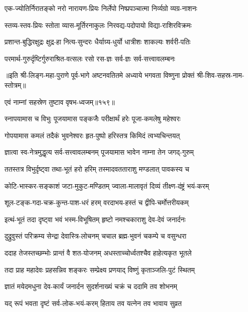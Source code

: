 \twolineshloka
{एक-ज्योतिर्निरातङ्को नरो नारायण-प्रियः}
{निर्लेपो निष्प्रपञ्चात्मा निर्व्यग्रो व्यग्र-नाशनः}

\twolineshloka
{स्तव्य-स्तव-प्रियः स्तोता व्यास-मूर्तिरनाकुलः}
{निरवद्य-पदोपायो विद्या-राशिरविक्रमः}

\twolineshloka
{प्रशान्त-बुद्धिरक्षुद्रः क्षुद्र-हा नित्य-सुन्दरः}
{धैर्याग्र्य-धुर्यो धात्रीशः शाकल्यः शर्वरी-पतिः}

\twolineshloka
{परमार्थ-गुरुर्दृष्टिर्गुरुराश्रित-वत्सलः}
{रसो रस-ज्ञः सर्व-ज्ञः सर्व-सत्त्वावलम्बनः}


॥इति श्री-लिङ्ग-महा-पुराणे पूर्व-भागे अष्टनवतितमे अध्याये भगवता विष्णुना प्रोक्तं श्री-शिव-सहस्र-नाम-स्तोत्रम्॥


{एवं नाम्नां सहस्रेण तुष्टाव वृषभ-ध्वजम्॥१५९॥}%

\resetShloka
\addtocounter{shlokacount}{159}


\twolineshloka
{स्नापयामास च विभुः पूजयामास पङ्कजैः}
{परीक्षार्थं हरेः पूजा-कमलेषु महेश्वरः}%

\twolineshloka
{गोपयामास कमलं तदैकं भुवनेश्वरः}
{हृत-पुष्पो हरिस्तत्र किमिदं त्वभ्यचिन्तयत्}%

\twolineshloka
{ज्ञात्वा स्व-नेत्रमुद्धृत्य सर्व-सत्त्वावलम्बनम्}
{पूजयामास भावेन नाम्ना तेन जगद्-गुरुम्}%

\twolineshloka
{ततस्तत्र विभुर्दृष्ट्वा तथा-भूतं हरो हरिम्}
{तस्मादवतताराशु मण्डलात् पावकस्य च}%

\twolineshloka
{कोटि-भास्कर-सङ्काशं जटा-मुकुट-मण्डितम्}
{ज्वाला-मालावृतं दिव्यं तीक्ष्ण-दंष्ट्रं भयं-करम्}%

\twolineshloka
{शूल-टङ्क-गदा-चक्र-कुन्त-पाश-धरं हरम्}
{वरदाभय-हस्तं च द्वीपि-चर्मोत्तरीयकम्}%

\twolineshloka
{इत्थं-भूतं तदा दृष्ट्वा भवं भस्म-विभूषितम्}
{हृष्टो नमश्चकाराशु देव-देवं जनार्दनः}%

\twolineshloka
{दुद्रुवुस्तं परिक्रम्य सेन्द्रा देवास्त्रि-लोचनम्}
{चचाल ब्रह्म-भुवनं चकम्पे च वसुन्धरा}%

\twolineshloka
{ददाह तेजस्तच्छम्भोः प्रान्तं वै शत-योजनम्}
{अधस्ताच्चोर्ध्वतश्चैव हाहेत्यकृत भूतले}%

\twolineshloka
{तदा प्राह महादेवः प्रहसन्निव शङ्करः}
{सम्प्रेक्ष्य प्रणयाद् विष्णुं कृताञ्जलि-पुटं स्थितम्}%

\twolineshloka
{ज्ञातं मयेदमधुना देव-कार्यं जनार्दन}
{सुदर्शनाख्यं चक्रं च ददामि तव शोभनम्}%

\twolineshloka
{यद् रूपं भवता दृष्टं सर्व-लोक-भयं-करम्}
{हिताय तव यत्नेन तव भावाय सुव्रत}%

